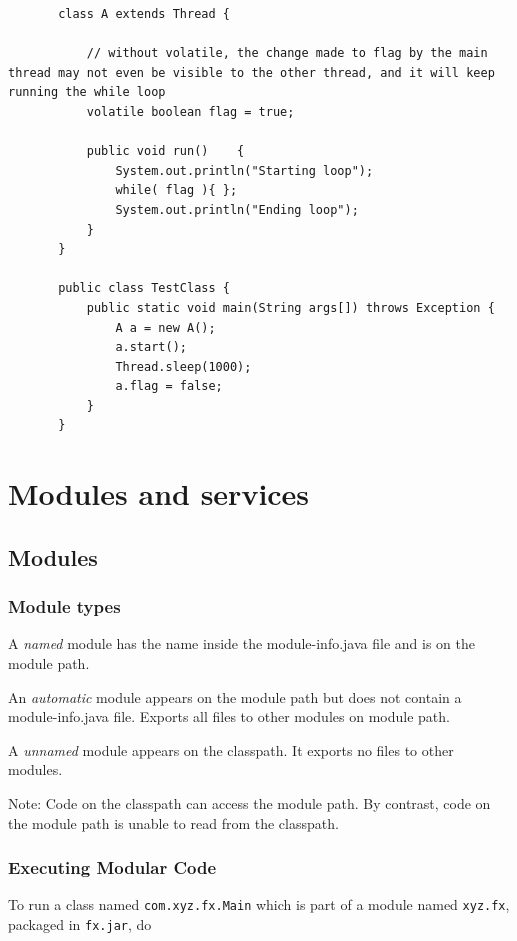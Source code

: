 \documentclass{scrartcl}
\begin{document}
    \begin{lstlisting}
       class A extends Thread {

           // without volatile, the change made to flag by the main thread may not even be visible to the other thread, and it will keep running the while loop
           volatile boolean flag = true;

           public void run()    {
               System.out.println("Starting loop");
               while( flag ){ };
               System.out.println("Ending loop");
           }
       }

       public class TestClass {
           public static void main(String args[]) throws Exception {
               A a = new A();
               a.start();
               Thread.sleep(1000);
               a.flag = false;
           }
       }
    \end{lstlisting}


\section{Modules and services}
\subsection{Modules}
\subsubsection{Module types}

    A \textit{named} module has the name inside the module-­info.java file and is on the module path.

    An \textit{automatic} module appears on the module path but does not contain a module-­info.java
    file. Exports all files to other modules on module path.

    A \textit{unnamed} module appears on the classpath. It exports no files to other modules.

    Note: Code on the classpath can access the module path. By contrast, code on the module path is unable to read from the classpath.


\subsubsection{Executing Modular Code}

To run a class named \lstinline|com.xyz.fx.Main| which is part of a module named \lstinline|xyz.fx|, packaged in \lstinline|fx.jar|, do
\end{document}

